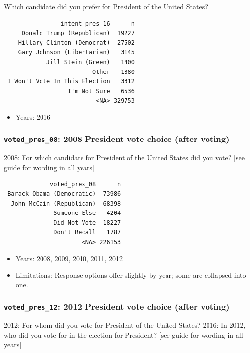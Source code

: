 \documentclass[10pt,article,oneside]{memoir}
\theoremstyle{definition}
\begin{document}
Which candidate did you prefer for President of the United States?

\begin{verbatim}
                intent_pres_16      n
     Donald Trump (Republican)  19227
    Hillary Clinton (Democrat)  27502
    Gary Johnson (Libertarian)   3145
            Jill Stein (Green)   1400
                         Other   1880
 I Won't Vote In This Election   3312
                  I'm Not Sure   6536
                          <NA> 329753
\end{verbatim}

\begin{itemize}
\tightlist
\item
  Years: 2016
\end{itemize}

\subsubsection{\texorpdfstring{\texttt{voted\_pres\_08}: 2008 President
vote choice (after
voting)}{voted\_pres\_08: 2008 President vote choice (after voting)}}\label{voted_pres_08-2008-president-vote-choice-after-voting}

2008: For which candidate for President of the United States did you
vote? {[}see guide for wording in all years{]}

\begin{verbatim}
             voted_pres_08      n
 Barack Obama (Democratic)  73986
  John McCain (Republican)  68398
              Someone Else   4204
              Did Not Vote  18227
              Don't Recall   1787
                      <NA> 226153
\end{verbatim}

\begin{itemize}
\tightlist
\item
  Years: 2008, 2009, 2010, 2011, 2012
\item
  Limitations: Response options offer slightly by year; some are
  collapsed into one.
\end{itemize}

\subsubsection{\texorpdfstring{\texttt{voted\_pres\_12}: 2012 President
vote choice (after
voting)}{voted\_pres\_12: 2012 President vote choice (after voting)}}\label{voted_pres_12-2012-president-vote-choice-after-voting}

2012: For whom did you vote for President of the United States? 2016: In
2012, who did you vote for in the election for President? {[}see guide
for wording in all years{]}
\end{document}

